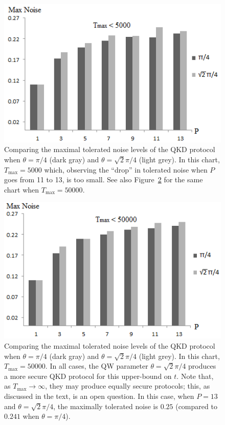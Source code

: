 \begin{figure}[h!]
  \centering
  \includegraphics[scale = 0.60]{maxNoiseCompare.png}
\caption{Comparing the maximal tolerated noise levels of the QKD protocol when $\theta = \pi/4$ (dark gray) and $\theta = \sqrt{2}\pi/4$ (light grey).  In this chart, $T_{\max} = 5000$ which, observing the ``drop'' in tolerated noise when $P$ goes from 11 to 13, is too small.  See also Figure~\ref{fig:prot1:walk2-2} for the same chart when $T_{\max} = 50000$.}\label{fig:prot1:walk2}
\end{figure}

\begin{figure}[h!]
  \centering
  \includegraphics[scale = 0.60]{maxNoiseCompareBigT.png}
\caption{Comparing the maximal tolerated noise levels of the QKD protocol when $\theta = \pi/4$ (dark gray) and $\theta = \sqrt{2}\pi/4$ (light grey).  In this chart, $T_{\max} = 50000$.  In all cases, the QW parameter $\theta = \sqrt{2}\pi/4$ produces a more secure QKD protocol for this upper-bound on $t$.  Note that, as $T_{\max} \rightarrow \infty$, they may produce equally secure protocols; this, as discussed in the text, is an open question.  In this case, when $P=13$ and $\theta = \sqrt{2}\pi/4$, the maximally tolerated noise is $0.25$ (compared to $0.241$ when $\theta = \pi/4$).}\label{fig:prot1:walk2-2}
\end{figure}


